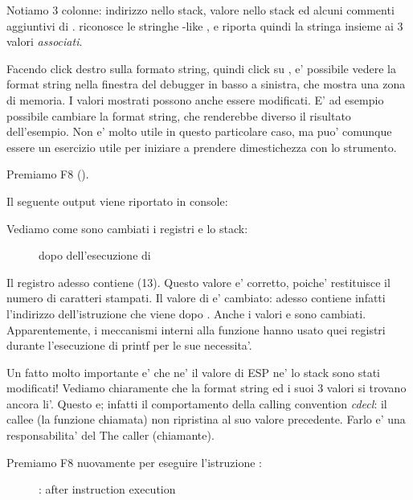 Notiamo 3 colonne: indirizzo nello stack, valore nello stack ed alcuni commenti aggiuntivi di \olly. 
\olly riconosce le stringhe \printf{}-like , e riporta quindi la stringa insieme ai 3 valori \emph{associati}.

Facendo click destro sulla formato string, quindi click su ,
e' possibile vedere la format string nella finestra del debugger in basso a sinistra, che mostra una zona di memoria.
I valori mostrati possono anche essere modificati.
E' ad esempio possibile cambiare la format string, che renderebbe diverso il risultato dell'esempio.
Non e' molto utile in questo particolare caso, ma puo' comunque essere un esercizio utile per iniziare a prendere dimestichezza con lo strumento.

\clearpage
Premiamo F8 (\stepover).

Il seguente output viene riportato in console:



Vediamo come sono cambiati i registri e lo stack:

\begin{figure}[H]
\centering
{}
\caption{\olly dopo dell'esecuzione di \printf{}}
\label{fig:printf3_olly_3}
\end{figure}

Il registro \EAX adesso contiene  (13).
Questo valore e' corretto, poiche' \printf restituisce il numero di caratteri stampati. 
Il valore di \EIP e' cambiato: adesso contiene infatti l'indirizzo dell'istruzione che viene dopo .
Anche i valori \ECX e \EDX sono cambiati.
Apparentemente, i meccanismi interni alla funzione \printf hanno usato quei registri durante l'esecuzione di printf per le sue necessita'.

Un fatto molto importante e' che ne' il valore di ESP ne' lo stack sono stati modificati!
Vediamo chiaramente che la format string ed i suoi 3 valori si trovano ancora li'.
Questo e; infatti il comportamento della calling convention \emph{cdecl}: il \gls{callee} (la funzione chiamata) non ripristina
\ESP al suo valore precedente. Farlo e' una responsabilita' del The \gls{caller} (chiamante).

\clearpage
Premiamo F8 nuovamente per eseguire l'istruzione :

\begin{figure}[H]
\centering
{}
\caption{\olly: after  instruction execution}
\label{fig:printf3_olly_4}
\end{figure}

